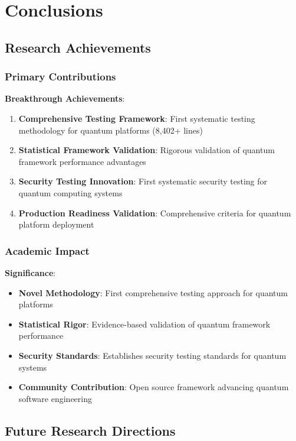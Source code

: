 \documentclass[12pt,a4paper]{article}
\begin{document}
\section{Conclusions}

\subsection{Research Achievements}

\subsubsection{Primary Contributions}

\textbf{Breakthrough Achievements}:
\begin{enumerate}
\item \textbf{Comprehensive Testing Framework}: First systematic testing methodology for quantum platforms (8,402+ lines)
\item \textbf{Statistical Framework Validation}: Rigorous validation of quantum framework performance advantages
\item \textbf{Security Testing Innovation}: First systematic security testing for quantum computing systems
\item \textbf{Production Readiness Validation}: Comprehensive criteria for quantum platform deployment
\end{enumerate}

\subsubsection{Academic Impact}

\textbf{Significance}:
\begin{itemize}
\item \textbf{Novel Methodology}: First comprehensive testing approach for quantum platforms
\item \textbf{Statistical Rigor}: Evidence-based validation of quantum framework performance
\item \textbf{Security Standards}: Establishes security testing standards for quantum systems
\item \textbf{Community Contribution}: Open source framework advancing quantum software engineering
\end{itemize}

\subsection{Future Research Directions}
\end{document}
